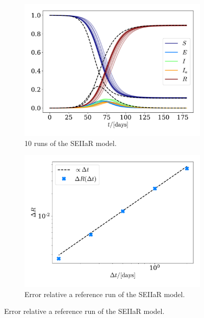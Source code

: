 \documentclass{article}
\begin{document}
    
    \begin{figure}[H]
        \centering
        \begin{subfigure}{.49\textwidth}
            \includegraphics[width=\textwidth]{../plots/2C/TestSEIIaR.pdf}
            \caption{10 runs of the SEIIaR model.}
            \label{SEIIaR}
        \end{subfigure}
        \begin{subfigure}{.49\textwidth}
            \includegraphics[width=\textwidth]{../plots/2C/conv.pdf}
            \caption{Error relative a reference run of the SEIIaR model.}
            \label{SEIIaR conv}
        \end{subfigure}
    \end{figure}
\end{document}
